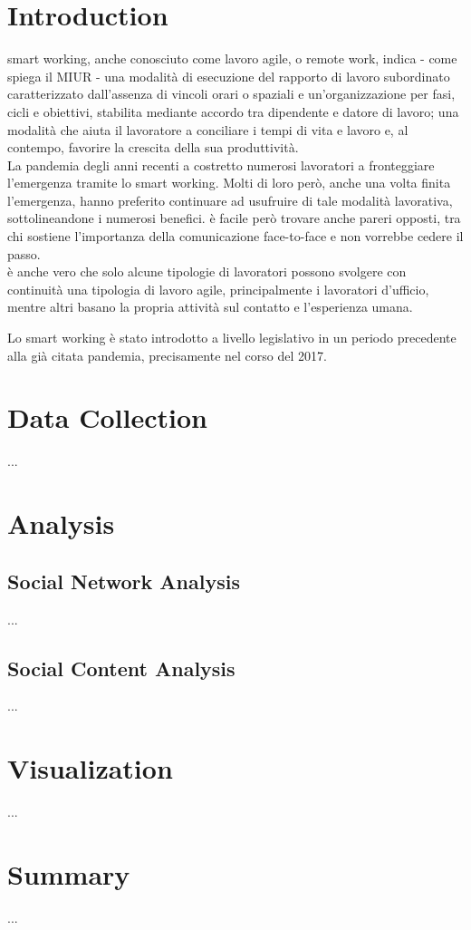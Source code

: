 \documentclass[12pt,journal,compsoc]{IEEEtran}
\begin{document}
\section{Introduction}
 smart working, anche conosciuto come lavoro agile, o remote work, indica - come spiega il MIUR \cite{MIUR} - una modalità di esecuzione del rapporto di lavoro subordinato caratterizzato dall'assenza di vincoli orari o spaziali e un'organizzazione per fasi, cicli e obiettivi, stabilita mediante accordo tra dipendente e datore di lavoro; una modalità che aiuta il lavoratore a conciliare i tempi di vita e lavoro e, al contempo, favorire la crescita della sua produttività.\\
La pandemia degli anni recenti a costretto numerosi lavoratori a fronteggiare l'emergenza tramite lo smart working. Molti di loro però, anche una volta finita l'emergenza, hanno preferito continuare ad usufruire di tale modalità lavorativa, sottolineandone i numerosi benefici. è facile però trovare anche pareri opposti, tra chi sostiene l'importanza della comunicazione face-to-face e non vorrebbe cedere il passo.\\
è anche vero che solo alcune tipologie di lavoratori possono svolgere con continuità una tipologia di lavoro agile, principalmente i lavoratori d'ufficio, mentre altri basano la propria attività sul contatto e l'esperienza umana.

Lo smart working è stato introdotto a livello legislativo in un periodo precedente alla già citata pandemia, precisamente nel corso del 2017.



\section{Data Collection}
...

\section{Analysis}
\subsection{Social Network Analysis}
...

\subsection{Social Content Analysis}
...

\section{Visualization}
...

\section{Summary}
...


\nocite{*}
\printbibliography
\end{document}
